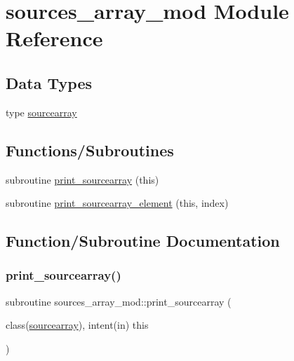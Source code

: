 \hypertarget{namespacesources__array__mod}{}\section{sources\+\_\+array\+\_\+mod Module Reference}
\label{namespacesources__array__mod}
\subsection*{Data Types}
\begin{DoxyCompactItemize}
\item 
type \mbox{\hyperlink{structsources__array__mod_1_1sourcearray}{sourcearray}}
\end{DoxyCompactItemize}
\subsection*{Functions/\+Subroutines}
\begin{DoxyCompactItemize}
\item 
subroutine \mbox{\hyperlink{namespacesources__array__mod_aa2e56a704fb4483fff2b2bd65c8db8da}{print\+\_\+sourcearray}} (this)
\item 
subroutine \mbox{\hyperlink{namespacesources__array__mod_a83b399b5839262af19adcae73824874e}{print\+\_\+sourcearray\+\_\+element}} (this, index)
\end{DoxyCompactItemize}


\subsection{Function/\+Subroutine Documentation}
\mbox{\label{namespacesources__array__mod_aa2e56a704fb4483fff2b2bd65c8db8da}} 
\subsubsection{\texorpdfstring{print\+\_\+sourcearray()}{print\_sourcearray()}}
{\footnotesize\ttfamily subroutine sources\+\_\+array\+\_\+mod\+::print\+\_\+sourcearray (\begin{DoxyParamCaption}\item[{class(\mbox{\hyperlink{structsources__array__mod_1_1sourcearray}{sourcearray}}), intent(in)}]{this }\end{DoxyParamCaption})\hspace{0.3cm}{\ttfamily [private]}}



